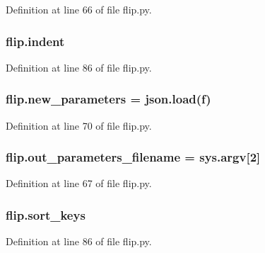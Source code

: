 Definition at line 66 of file flip.\+py.

\subsubsection[{\texorpdfstring{indent}{indent}}]{\setlength{\rightskip}{0pt plus 5cm}flip.\+indent}\hypertarget{namespaceflip_a821a655314c8dd55c67dc23de69813ba}{}\label{namespaceflip_a821a655314c8dd55c67dc23de69813ba}


Definition at line 86 of file flip.\+py.

\subsubsection[{\texorpdfstring{new\+\_\+parameters}{new_parameters}}]{\setlength{\rightskip}{0pt plus 5cm}flip.\+new\+\_\+parameters = json.\+load(f)}\hypertarget{namespaceflip_a7a47fe7b1012ae7705c69a1a04a8820d}{}\label{namespaceflip_a7a47fe7b1012ae7705c69a1a04a8820d}


Definition at line 70 of file flip.\+py.

\subsubsection[{\texorpdfstring{out\+\_\+parameters\+\_\+filename}{out_parameters_filename}}]{\setlength{\rightskip}{0pt plus 5cm}flip.\+out\+\_\+parameters\+\_\+filename = sys.\+argv\mbox{[}2\mbox{]}}\hypertarget{namespaceflip_a4defd3022c5c2b0de29705212115b6a7}{}\label{namespaceflip_a4defd3022c5c2b0de29705212115b6a7}


Definition at line 67 of file flip.\+py.

\subsubsection[{\texorpdfstring{sort\+\_\+keys}{sort_keys}}]{\setlength{\rightskip}{0pt plus 5cm}flip.\+sort\+\_\+keys}\hypertarget{namespaceflip_acb70e74cbeffe2b8d452c1df5678611f}{}\label{namespaceflip_acb70e74cbeffe2b8d452c1df5678611f}


Definition at line 86 of file flip.\+py.

